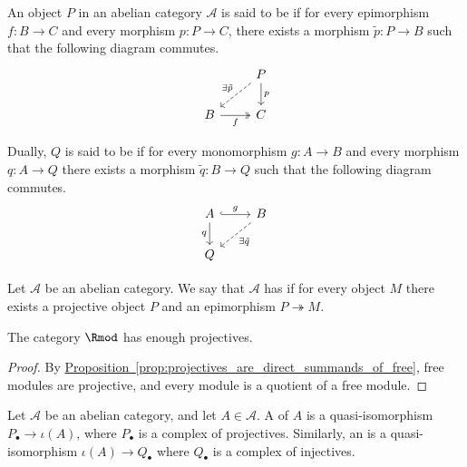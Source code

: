 \documentclass[main.tex]{subfiles}
\begin{document}
\begin{definition}[projective]
  \label{def:projective}
  An object $P$ in an abelian category $\mathcal{A}$ is said to be  if for every epimorphism $f\colon B \to C$ and every morphism $p\colon P \to C$, there exists a morphism $\tilde{p}\colon P \to B$ such that the following diagram commutes.
  \begin{equation*}
    \begin{tikzcd}
      & P
      \arrow[d, "p"]
      \arrow[dl, dashed, swap, "\exists\tilde{p}"]
      \\
      B
      \arrow[r, twoheadrightarrow, swap, "f"]
      & C
    \end{tikzcd}
  \end{equation*}

  Dually, $Q$ is said to be  if for every monomorphism $g\colon A \to B$ and every morphism $q\colon A \to Q$ there exists a morphism $\tilde{q}\colon B \to Q$ such that the following diagram commutes.
  \begin{equation*}
    \begin{tikzcd}
      A
      \arrow[r, hookrightarrow, "g"]
      \arrow[d, swap, "q"]
      & B
      \arrow[dl, dashed, "\exists \tilde{q}"]
      \\
      Q
    \end{tikzcd}
  \end{equation*}
\end{definition}

\begin{definition}
  \label{def:enough_projectives}
  Let $\mathcal{A}$ be an abelian category. We say that $\mathcal{A}$ has  if for every object $M$ there exists a projective object $P$ and an epimorphism $P \twoheadrightarrow M$.
\end{definition}

\begin{corollary}
  The category $\Rmod$ has enough projectives.
\end{corollary}
\begin{proof}
  By \hyperref[prop:projectives_are_direct_summands_of_free]{Proposition~\ref*{prop:projectives_are_direct_summands_of_free}}, free modules are projective, and every module is a quotient of a free module.
\end{proof}

\begin{definition}
  \label{def:projective_injective_resolution}
  Let $\mathcal{A}$ be an abelian category, and let $A \in \mathcal{A}$. A  of $A$ is a quasi-isomorphism $P_{\bullet} \to \iota(A)$, where $P_{\bullet}$ is a complex of projectives. Similarly, an  is a quasi-isomorphism $\iota(A) \to Q_{\bullet}$ where $Q_{\bullet}$ is a complex of injectives.
\end{definition}
\end{document}
